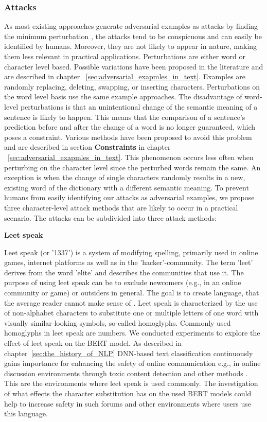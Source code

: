 \subsubsection{Attacks}
\label{sec:attacks_method}
As most existing approaches generate adversarial examples as attacks by finding the minimum perturbation \cite{liang2017deep, ebrahimi2017hotflip, gao2018black, li2018textbugger, alzantot2018generating, jin2019bert, garg2020bae}, the attacks tend to be conspicuous and can easily be identified by humans. Moreover, they are not likely to appear in nature, making them less relevant in practical applications. Perturbations are either word or character level based. Possible variations have been proposed in the literature and are described in chapter ~\ref{sec:adversarial_exapmles_in_text}. Examples are randomly replacing, deleting, swapping, or inserting characters. Perturbations on the word level basis use the same example approaches.  
The disadvantage of word-level perturbations is that an unintentional change of the semantic meaning of a sentence is likely to happen. This means that the comparison of a sentence's prediction before and after the change of a word is no longer guaranteed, which poses a constraint. Various methods have been proposed to avoid this problem and are described in section \textbf{Constraints} in chapter ~\ref{sec:adversarial_exapmles_in_text}. 
This phenomenon occurs less often when perturbing on the character level since the perturbed words remain the same. An exception is when the change of single characters randomly results in a new, existing word of the dictionary with a different semantic meaning. 
To prevent humans from easily identifying our attacks as adversarial examples, we propose three character-level attack methods that are likely to occur in a practical scenario. The attacks can be subdivided into three attack methods:


\textbf{Leet speak}

Leet speak (or '1337') is a system of modifying spelling, primarily used in online games, internet platforms as well as in the 'hacker'-community. The term 'leet' derives from the word 'elite' and describes the communities that use it. The purpose of using leet speak can be to exclude newcomers (e.g., in an online community or game) or outsiders in general. The goal is to create language, that the average reader cannot make sense of \cite{thomas2002hacker}.
Leet speak is characterized by the use of non-alphabet characters to substitute one or multiple letters of one word with visually similar-looking symbols, so-called homoglyphs. Commonly used homoglyphs in leet speak are numbers. 
We conducted experiments to explore the effect of leet speak on the BERT model. As described in chapter~\ref{sec:the_history_of_NLP} DNN-based text classification continuously gains importance for enhancing the safety of online communication e.g., in online discussion environments through toxic content detection and other methods \cite{kumar2011natural}. This are the environments where leet speak is used commonly. The investigation of what effects the character substitution has on the used BERT models could help to increase safety in such forums and other environments where users use this language. 

